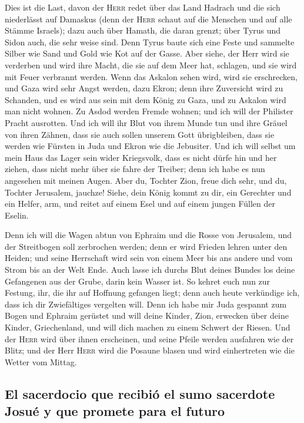  Dies ist die Last, davon der \textsc{Herr} redet über das
Land Hadrach und die sich niederlässt auf Damaskus (denn der
\textsc{Herr} schaut auf die Menschen und auf alle Stämme Israels);
 dazu auch über Hamath, die daran grenzt; über Tyrus und
Sidon auch, die sehr weise sind.  Denn Tyrus baute sich
eine Feste und sammelte Silber wie Sand und Gold wie Kot auf der Gasse.
 Aber siehe, der Herr wird sie verderben und wird ihre
Macht, die sie auf dem Meer hat, schlagen, und sie wird mit Feuer
verbrannt werden.  Wenn das Askalon sehen wird, wird sie
erschrecken, und Gaza wird sehr Angst werden, dazu Ekron; denn ihre
Zuversicht wird zu Schanden, und es wird aus sein mit dem König zu Gaza,
und zu Askalon wird man nicht wohnen.  Zu Asdod werden
Fremde wohnen; und ich will der Philister Pracht ausrotten.
 Und ich will ihr Blut von ihrem Munde tun und ihre Gräuel
von ihren Zähnen, dass sie auch sollen unserem Gott übrigbleiben, dass
sie werden wie Fürsten in Juda und Ekron wie die Jebusiter.
 Und ich will selbst um mein Haus das Lager sein wider
Kriegsvolk, dass es nicht dürfe hin und her ziehen, dass nicht mehr über
sie fahre der Treiber; denn ich habe es nun angesehen mit meinen Augen.
 Aber du, Tochter Zion, freue dich sehr, und du, Tochter
Jerusalem, jauchze! Siehe, dein König kommt zu dir, ein Gerechter und
ein Helfer, arm, und reitet auf einem Esel und auf einem jungen Füllen
der Eselin.

 Denn ich will die Wagen abtun von Ephraim und die Rosse
von Jerusalem, und der Streitbogen soll zerbrochen werden; denn er wird
Frieden lehren unter den Heiden; und seine Herrschaft wird sein von
einem Meer bis ans andere und vom Strom bis an der Welt Ende.
 Auch lasse ich durchs Blut deines Bundes los deine
Gefangenen aus der Grube, darin kein Wasser ist.  So
kehret euch nun zur Festung, ihr, die ihr auf Hoffnung gefangen liegt;
denn auch heute verkündige ich, dass ich dir Zwiefältiges vergelten
will.  Denn ich habe mir Juda gespannt zum Bogen und
Ephraim gerüstet und will deine Kinder, Zion, erwecken über deine
Kinder, Griechenland, und will dich machen zu einem Schwert der Riesen.
 Und der \textsc{Herr} wird über ihnen erscheinen, und
seine Pfeile werden ausfahren wie der Blitz; und der Herr \textsc{Herr}
wird die Posaune blasen und wird einhertreten wie die Wetter vom Mittag.

\hypertarget{el-sacerdocio-que-recibiuxf3-el-sumo-sacerdote-josuuxe9-y-que-promete-para-el-futuro}{%
\subsection{El sacerdocio que recibió el sumo sacerdote Josué y que
promete para el
futuro}\label{el-sacerdocio-que-recibiuxf3-el-sumo-sacerdote-josuuxe9-y-que-promete-para-el-futuro}}

